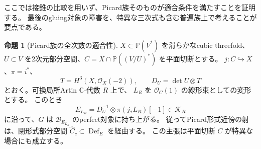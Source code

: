 \documentclass[a4paper,11pt]{ltjsarticle}
\theoremstyle{definition}
\newtheorem{theorem}{命題}[section]
\newcommand{\CC}{\mathbb C}
\newcommand{\OO}{\mathcal O}
\newcommand{\PP}{\mathbb P}
\newcommand{\Def}{\operatorname{Def}}
\begin{document}
ここでは接錐の比較を用いず、Picard族そのものが適合条件を満たすことを証明する。
最後のgluing対象の障害を、特異な三次式も含む普遍族上で考えることが要点である。

\begin{theorem}[Picard族の全次数の適合性]\label{thm:picard-compatible}
$X\subset\PP(V^*)$ を滑らかなcubic threefold、
$U\subset V$ を2次元部分空間、$C=X\cap\PP((V/U)^*)$ を平面切断とする。
$j:C\hookrightarrow X$、$\pi=i^*$、
\[
 T=H^3(X,\OO_X(-2)),\qquad D_U=\det U\otimes T
\]
とおく。可換局所Artin $\CC$-代数 $R$ 上で、
$L_R$ を $\OO_C(1)$ の線形束としての変形とする。
このとき
\[
 E_{L_R}=D_U^{-1}\otimes\pi(j_*L_R)[-1]\in\mathcal K_R
\]
に沿って、$G$ は $\mathcal B_{E_{L_R}}$ のperfect対象に持ち上がる。
従ってPicard形式近傍の射は、閉形式部分空間
$\widehat C_c\subset\Def_E$ を経由する。
この主張は平面切断 $C$ が特異な場合にも成立する。
\end{theorem}
\end{document}
